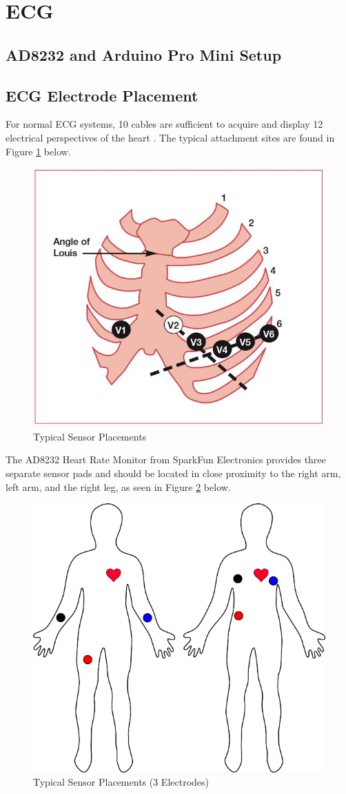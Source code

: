 \section{ECG}

\subsection{AD8232 and Arduino Pro Mini Setup}



\subsection{ECG Electrode Placement}
For normal ECG systems, 10 cables are sufficient to acquire and display 12 electrical perspectives of the heart \cite{ashley2004conquering}. The typical attachment sites are found in Figure \ref{standardattachment} below. 

\begin{figure}[H]
	\centering
	\includegraphics[width=0.5\linewidth]{standardattachment.jpg}
	\caption{Typical Sensor Placements 
		\cite{ashley2004conquering}}
	\label{standardattachment}
\end{figure} 

The AD8232 Heart Rate Monitor from SparkFun Electronics \cite{ad8232} provides three separate sensor pads and should be located in close proximity to the right arm, left arm, and the right leg, as seen in Figure \ref{sensorplacement} below. 

\begin{figure}[H]
	\centering
	\includegraphics[width=0.5\linewidth]{body.png}
	\caption{Typical Sensor Placements (3 Electrodes)
	\cite{ad8232}}
	\label{sensorplacement}
\end{figure} 

